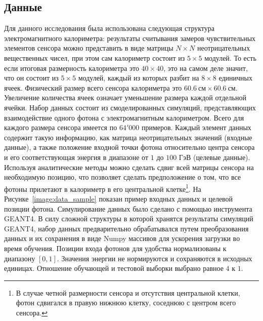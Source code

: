 \documentclass[a4paper,12pt]{extarticle}
\begin{document}
\subsection{Данные}
\label{subsection:data}

Для данного исследования была использована следующая структура электромагнитного калориметра: результаты считывания замеров чувствительных элементов сенсора можно представить в виде матрицы $N \times N$ неотрицательных вещественных чисел, при этом сам калориметр состоит из $5 \times 5$ модулей. То есть если итоговая размерность калориметра это $40 \times 40$, это на самом деле значит, что он состоит из $5 \times 5$ модулей, каждый из которых разбит на $8 \times 8$ единичных ячеек. Физический размер всего сенсора калориметра это $60.6 \: \text{см} \times 60.6 \: \text{см}$. Увеличение количества ячеек означает уменьшение размера каждой отдельной ячейки. Набор данных состоит из смоделированных симуляций, представляющих взаимодействие одного фотона с электромагнитным калориметром. Всего для каждого размера сенсора имеется по $64'000$ примеров. Каждый элемент данных содержит такую информацию, как матрица неотрицательных значений (входные данные), а также положение входной точки фотона относительно центра сенсора и его соответствующая энергия в диапазоне от $1$ до $100$ ГэВ (целевые данные). Используя аналитические методы можно сделать сдвиг всей матрицы сенсора на необходимую позицию, что позволяет сделать предположение о том, что все фотоны прилетают в калориметр в его центральной клетке\footnote{В случае четной размерности сенсора и отсутствия центральной клетки, фотон сдвигался в правую нижнюю клетку, соседнюю с центром всего сенсора.}. На Рисунке~\ref{image:data_sample} показан пример входных данных и целевой позиции фотона. Симулирование данных было сделано с помощью инструмента GEANT4. В силу сложной структуры в которой хранятся результаты симуляций GEANT4, набор данных предварительно обрабатывался путем преобразования данных и их сохранения в виде Numpy массивов для ускорения загрузки во время обучения. Позиции входа фотонов для удобства нормализованы к диапазону $[0, 1]$. Значения энергии не нормируются и сохраняются в исходных единицах. Отношение обучающей и тестовой выборки выбрано равное $4$ к $1$.
\end{document}
